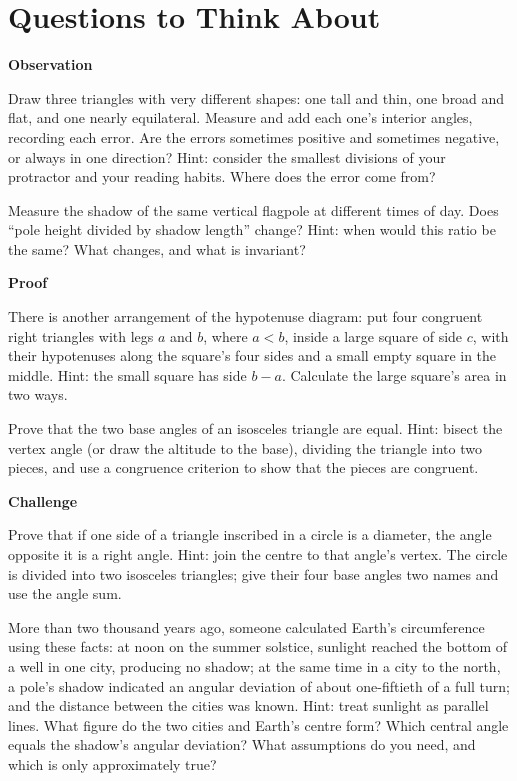 \section*{Questions to Think About}

\textbf{Observation}
\begin{sikao}
\item Draw three triangles with very different shapes: one tall and thin, one broad and flat, and one nearly equilateral. Measure and add each one's interior angles, recording each error. Are the errors sometimes positive and sometimes negative, or always in one direction? Hint: consider the smallest divisions of your protractor and your reading habits. Where does the error come from?
\item Measure the shadow of the same vertical flagpole at different times of day. Does ``pole height divided by shadow length'' change? Hint: when would this ratio be the same? What changes, and what is invariant?
\end{sikao}

\textbf{Proof}
\begin{sikao}
\item There is another arrangement of the hypotenuse diagram: put four congruent right triangles with legs $a$ and $b$, where $a<b$, inside a large square of side $c$, with their hypotenuses along the square's four sides and a small empty square in the middle. Hint: the small square has side $b-a$. Calculate the large square's area in two ways.
\item Prove that the two base angles of an isosceles triangle are equal. Hint: bisect the vertex angle (or draw the altitude to the base), dividing the triangle into two pieces, and use a congruence criterion to show that the pieces are congruent.
\end{sikao}

\textbf{Challenge}
\begin{sikao}
\item Prove that if one side of a triangle inscribed in a circle is a diameter, the angle opposite it is a right angle. Hint: join the centre to that angle's vertex. The circle is divided into two isosceles triangles; give their four base angles two names and use the angle sum.
\item More than two thousand years ago, someone calculated Earth's circumference using these facts: at noon on the summer solstice, sunlight reached the bottom of a well in one city, producing no shadow; at the same time in a city to the north, a pole's shadow indicated an angular deviation of about one-fiftieth of a full turn; and the distance between the cities was known. Hint: treat sunlight as parallel lines. What figure do the two cities and Earth's centre form? Which central angle equals the shadow's angular deviation? What assumptions do you need, and which is only approximately true?
\end{sikao}

